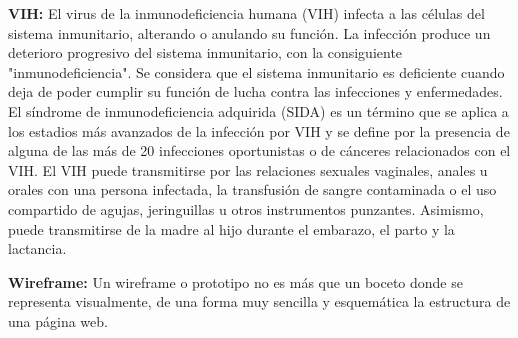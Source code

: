 \textbf{VIH: } El virus de la inmunodeficiencia humana (VIH) infecta a las c\'elulas del sistema inmunitario, alterando o anulando su funci\'on. La infecci\'on produce un deterioro progresivo del sistema inmunitario, con la consiguiente "inmunodeficiencia". Se considera que el sistema inmunitario es deficiente cuando deja de poder cumplir su funci\'on de lucha contra las infecciones y enfermedades. El s\'indrome de inmunodeficiencia adquirida (SIDA) es un t\'ermino que se aplica a los estadios m\'as avanzados de la infecci\'on por VIH y se define por la presencia de alguna de las m\'as de 20 infecciones oportunistas o de c\'anceres relacionados con el VIH. El VIH puede transmitirse por las relaciones sexuales vaginales, anales u orales con una persona infectada, la transfusi\'on de sangre contaminada o el uso compartido de agujas, jeringuillas u otros instrumentos punzantes. Asimismo, puede transmitirse de la madre al hijo durante el embarazo, el parto y la lactancia.

\textbf{Wireframe: } Un wireframe o prototipo no es m\'as que un boceto donde se representa visualmente, de una forma muy sencilla y esquem\'atica la estructura de una p\'agina web.
    
